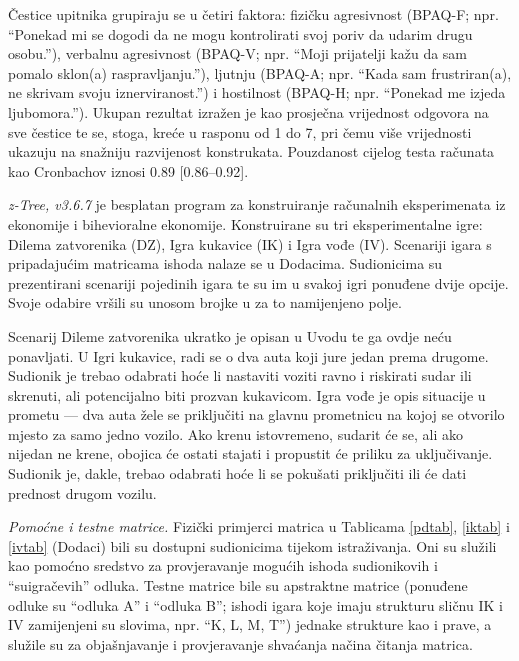 \documentclass[a4paper, 12pt]{report}
\begin{document}
Čestice
upitnika grupiraju se u četiri faktora: fizičku agresivnost
(BPAQ-F; npr. \enquote{Ponekad mi se dogodi da ne mogu kontrolirati svoj poriv da udarim
    drugu osobu.}), verbalnu agresivnost (BPAQ-V; npr.
\enquote{Moji prijatelji kažu da sam
    pomalo sklon(a) raspravljanju.}), ljutnju
(BPAQ-A; npr. \enquote{Kada sam frustriran(a),
    ne skrivam svoju iznerviranost.}) i
hostilnost (BPAQ-H; npr. \enquote{Ponekad me izjeda
    ljubomora.}). Ukupan rezultat izražen je kao
prosječna vrijednost odgovora na sve čestice te se, stoga, kreće u rasponu od 1
do 7, pri čemu više vrijednosti ukazuju na snažniju razvijenost konstrukata.
Pouzdanost cijelog testa
računata kao Cronbachov {\textalpha} iznosi 0.89 [0.86--0.92].

\emph{z-Tree, v3.6.7} \citep{fischbacher2007z} je besplatan program za
konstruiranje računalnih eksperimenata iz ekonomije i bihevioralne ekonomije.
Konstruirane su tri eksperimentalne igre: Dilema zatvorenika (DZ), Igra kukavice
(IK) i Igra vođe (IV). Scenariji igara s pripadajućim matricama ishoda nalaze se
u Dodacima. Sudionicima su prezentirani scenariji pojedinih igara te su im
u svakoj igri ponuđene dvije  opcije. Svoje odabire vršili su unosom
brojke u za to namijenjeno polje.

Scenarij Dileme zatvorenika ukratko je opisan u Uvodu te ga ovdje neću
ponavljati. U Igri kukavice, radi se o dva auta koji jure jedan prema drugome.
Sudionik je trebao odabrati hoće li nastaviti voziti ravno i riskirati sudar ili
skrenuti, ali potencijalno biti prozvan kukavicom. Igra vođe je opis situacije
u prometu --- dva auta žele se priključiti na glavnu prometnicu na kojoj se
otvorilo mjesto za samo jedno vozilo. Ako krenu
istovremeno, sudarit će se, ali ako nijedan ne  krene, obojica će ostati stajati
i propustit će priliku za uključivanje. Sudionik je, dakle, trebao odabrati hoće
li se pokušati priključiti ili će dati prednost drugom vozilu.

\emph{Pomoćne i testne matrice.} Fizički primjerci matrica u Tablicama
\ref{pdtab}, \ref{iktab} i \ref{ivtab} (Dodaci) bili su dostupni sudionicima tijekom
istraživanja. Oni su služili kao pomoćno sredstvo za provjeravanje 
mogućih ishoda sudionikovih i \enquote{suigračevih} odluka. Testne matrice bile
su apstraktne matrice (ponuđene odluke su \enquote{odluka A} i \enquote{odluka
    B}; ishodi igara koje imaju strukturu sličnu IK i IV  zamijenjeni su
 slovima, npr. \enquote{K, L, M, T}) jednake strukture kao i prave, a služile su za
objašnjavanje i provjeravanje shvaćanja načina čitanja matrica.
\end{document}
